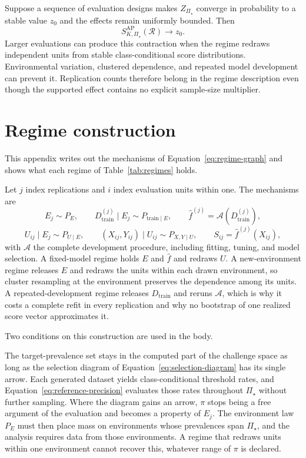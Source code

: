 \documentclass[11pt]{article}
\newcommand{\Regime}{\mathcal{R}}
\newcommand{\PSet}{\Pi_\star}
\theoremstyle{remark}
\begin{document}
Suppose a sequence of evaluation designs makes $Z_{\PSet}$ converge in probability to a stable value $z_0$ and the effects remain uniformly bounded. Then
\[
S_{K,\PSet}^{\mathrm{AP}}(\Regime)
\longrightarrow
z_0.
\]
Larger evaluations can produce this contraction when the regime redraws independent units from stable class-conditional score distributions. Environmental variation, clustered dependence, and repeated model development can prevent it. Replication counts therefore belong in the regime description even though the supported effect contains no explicit sample-size multiplier.

\section{Regime construction}
\label{app:regime}

This appendix writes out the mechanisms of Equation~\eqref{eq:regime-graph} and shows what each regime of Table~\ref{tab:regimes} holds.

Let $j$ index replications and $i$ index evaluation units within one. The mechanisms are
\[
E_j\sim P_E,
\qquad
D_{\mathrm{train}}^{(j)}\mid E_j\sim P_{\mathrm{train}\mid E},
\qquad
\widehat f^{(j)}=\mathcal{A}\!\left(D_{\mathrm{train}}^{(j)}\right),
\]
\[
U_{ij}\mid E_j\sim P_{U\mid E},
\qquad
(X_{ij},Y_{ij})\mid U_{ij}\sim P_{X,Y\mid U},
\qquad
S_{ij}=\widehat f^{(j)}(X_{ij}),
\]
with $\mathcal{A}$ the complete development procedure, including fitting, tuning, and model selection. A fixed-model regime holds $E$ and $\widehat f$ and redraws $U$. A new-environment regime releases $E$ and redraws the units within each drawn environment, so cluster resampling at the environment preserves the dependence among its units. A repeated-development regime releases $D_{\mathrm{train}}$ and reruns $\mathcal{A}$, which is why it costs a complete refit in every replication and why no bootstrap of one realized score vector approximates it.

Two conditions on this construction are used in the body.

The target-prevalence set stays in the computed part of the challenge space as long as the selection diagram of Equation~\eqref{eq:selection-diagram} has its single arrow. Each generated dataset yields class-conditional threshold rates, and Equation~\eqref{eq:reference-precision} evaluates those rates throughout $\PSet$ without further sampling. Where the diagram gains an arrow, $\pi$ stops being a free argument of the evaluation and becomes a property of $E_j$. The environment law $P_E$ must then place mass on environments whose prevalences span $\PSet$, and the analysis requires data from those environments. A regime that redraws units within one environment cannot recover this, whatever range of $\pi$ is declared.
\end{document}
